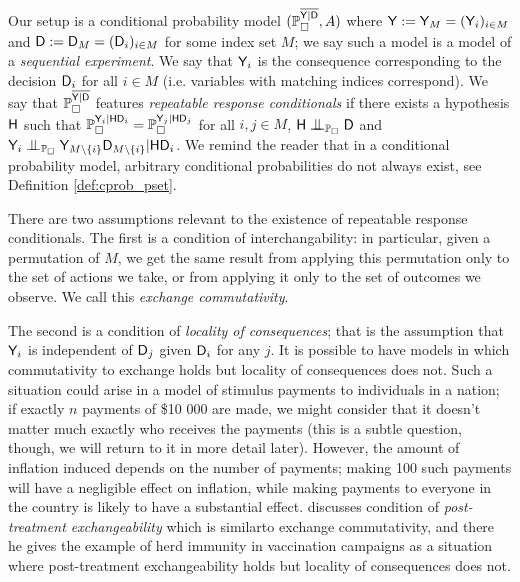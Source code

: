Our setup is a conditional probability model $(\mathbb{P}_\square^{\overline{\mathsf{Y}|\mathsf{D}}},A)$ where $\mathsf{Y}:=\mathsf{Y}_M=(\mathsf{Y}_i)_{i\in M}$ and $\mathsf{D}:=\mathsf{D}_M=(\mathsf{D}_i)_{i\in M}$ for some index set $M$; we say such a model is a model of a \emph{sequential experiment}. We say that $\mathsf{Y}_i$ is the consequence corresponding to the decision $\mathsf{D}_i$ for all $i\in M$ (i.e. variables with matching indices correspond). We say that $\mathbb{P}_\square^{\overline{\mathsf{Y}|\mathsf{D}}}$ features \emph{repeatable response conditionals} if there exists a hypothesis $\mathsf{H}$ such that $\mathbb{P}_\square^{\mathsf{Y}_i|\mathsf{H}\mathsf{D}_i}=\mathbb{P}_\square^{\mathsf{Y}_j|\mathsf{H}\mathsf{D}_j}$ for all $i,j\in M$, $\RV{H}\CI_{\prob{P}_\square} \RV{D}$ and $\RV{Y}_i\CI_{\prob{P}_{\square}} \RV{Y}_{M\setminus \{i\}} \RV{D}_{M\setminus \{i\}} |\RV{H}\RV{D}_i$. We remind the reader that in a conditional probability model, arbitrary conditional probabilities do not always exist, see Definition \ref{def:cprob_pset}.

There are two assumptions relevant to the existence of repeatable response conditionals. The first is a condition of interchangability: in particular, given a permutation of $M$, we get the same result from applying this permutation only to the set of actions we take, or from applying it only to the set of outcomes we observe. We call this \emph{exchange commutativity}.

The second is a condition of \emph{locality of consequences}; that is the assumption that $\mathsf{Y}_i$ is independent of $\mathsf{D}_j$ given $\mathsf{D}_i$ for any $j$. It is possible to have models in which commutativity to exchange holds but locality of consequences does not. Such a situation could arise in a model of stimulus payments to individuals in a nation; if exactly $n$ payments of \$10 000 are made, we might consider that it doesn't matter much exactly who receives the payments (this is a subtle question, though, we will return to it in more detail later). However, the amount of inflation induced depends on the number of payments; making 100 such payments will have a negligible effect on inflation, while making payments to everyone in the country is likely to have a substantial effect. \citet{dawid_causal_2000} discusses condition of \emph{post-treatment exchangeability} which is similarto exchange commutativity, and there he gives the example of herd immunity in vaccination campaigns as a situation where post-treatment exchangeability holds but locality of consequences does not.

